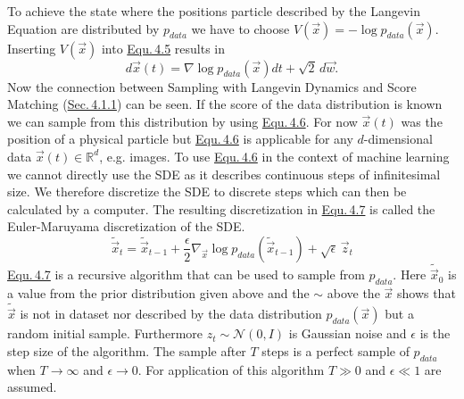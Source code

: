 To achieve the state where the positions particle described by the Langevin Equation are distributed by $p_{data}$ we have to choose $V(\vec{x})=-\log p_{data}({\vec{x}})$. Inserting $V(\vec{x})$ into \hyperref[equ:4.5]{Equ.\,4.5} results in
%
\begin{equation} \label{equ:4.6}
    d\vec{x}(t)=\nabla\log p_{data}(\vec{x})dt+\sqrt{2}\,d\vec{w}.
\end{equation}
%
Now the connection between Sampling with Langevin Dynamics and Score Matching (\hyperref[sec:4.1.1]{Sec.\,4.1.1}) can be seen. If the score of the data distribution is known we can sample from this distribution by using \hyperref[equ:4.6]{Equ.\,4.6}. For now $\vec{x}(t)$ was the position of a physical particle but \hyperref[equ:4.6]{Equ.\,4.6} is applicable for any $d$-dimensional data $\vec{x}(t)\in\mathbb{R}^d$, e.g. images. To use \hyperref[equ:4.6]{Equ.\,4.6} in the context of machine learning we cannot directly use the SDE as it describes continuous steps of infinitesimal size. We therefore discretize the SDE to discrete steps which can then be calculated by a computer. The resulting discretization in \hyperref[equ:4.7]{Equ.\,4.7} is called the Euler-Maruyama discretization of the SDE.
%
\begin{equation} \label{equ:4.7}
    \tilde{\vec{x}}_t=\tilde{\vec{x}}_{t-1}+\frac{\epsilon}{2}\nabla_{\vec{x}}\log p_{data}(\tilde{\vec{x}}_{t-1})+\sqrt{\epsilon}\,\vec{z}_t
\end{equation}
%
\hyperref[equ:4.7]{Equ.\,4.7} is a recursive algorithm that can be used to sample from $p_{data}$. Here $\tilde{\vec{x}}_0$ is a value from the prior distribution given above and the $\sim$ above the $\vec{x}$ shows that $\tilde{\vec{x}}$ is not in dataset nor described by the data distribution $p_{data}(\vec{x})$ but a random initial sample. Furthermore $z_t\sim\mathcal{N}(0, I)$ is Gaussian noise and $\epsilon$ is the step size of the algorithm. The sample after $T$ steps is a perfect sample of $p_{data}$ when $T\rightarrow\infty$ and $\epsilon\rightarrow0$. For application of this algorithm $T\gg0$ and $\epsilon\ll1$ are assumed.

